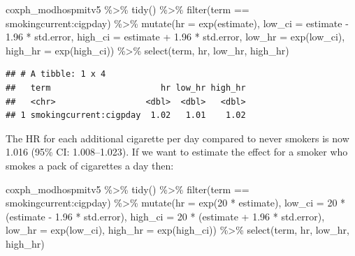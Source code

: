 \documentclass[
]{book}
\newenvironment{Shaded}{\begin{snugshade}}{\end{snugshade}}
\newcommand{\AttributeTok}[1]{\textcolor[rgb]{0.77,0.63,0.00}{#1}}
\newcommand{\DecValTok}[1]{\textcolor[rgb]{0.00,0.00,0.81}{#1}}
\newcommand{\FloatTok}[1]{\textcolor[rgb]{0.00,0.00,0.81}{#1}}
\newcommand{\FunctionTok}[1]{\textcolor[rgb]{0.00,0.00,0.00}{#1}}
\newcommand{\NormalTok}[1]{#1}
\newcommand{\SpecialCharTok}[1]{\textcolor[rgb]{0.00,0.00,0.00}{#1}}
\newcommand{\StringTok}[1]{\textcolor[rgb]{0.31,0.60,0.02}{#1}}
\begin{document}
\begin{Shaded}
\begin{Highlighting}[]
\NormalTok{coxph\_modhospmitv5 }\SpecialCharTok{\%\textgreater{}\%} 
  \FunctionTok{tidy}\NormalTok{() }\SpecialCharTok{\%\textgreater{}\%} 
  \FunctionTok{filter}\NormalTok{(term }\SpecialCharTok{==} \StringTok{\textquotesingle{}smokingcurrent:cigpday\textquotesingle{}}\NormalTok{) }\SpecialCharTok{\%\textgreater{}\%}
  \FunctionTok{mutate}\NormalTok{(}\AttributeTok{hr =} \FunctionTok{exp}\NormalTok{(estimate),}
         \AttributeTok{low\_ci =}\NormalTok{ estimate }\SpecialCharTok{{-}} \FloatTok{1.96} \SpecialCharTok{*}\NormalTok{ std.error, }
         \AttributeTok{high\_ci =}\NormalTok{ estimate }\SpecialCharTok{+} \FloatTok{1.96} \SpecialCharTok{*}\NormalTok{ std.error, }
         \AttributeTok{low\_hr =} \FunctionTok{exp}\NormalTok{(low\_ci), }
         \AttributeTok{high\_hr =} \FunctionTok{exp}\NormalTok{(high\_ci)) }\SpecialCharTok{\%\textgreater{}\%} 
  \FunctionTok{select}\NormalTok{(term, hr, low\_hr, high\_hr)}
\end{Highlighting}
\end{Shaded}

\begin{verbatim}
## # A tibble: 1 x 4
##   term                      hr low_hr high_hr
##   <chr>                  <dbl>  <dbl>   <dbl>
## 1 smokingcurrent:cigpday  1.02   1.01    1.02
\end{verbatim}

The HR for each additional cigarette per day compared to never smokers is now 1.016 (95\% CI: 1.008--1.023). If we want to estimate the effect for a smoker who smokes a pack of cigarettes a day then:

\begin{Shaded}
\begin{Highlighting}[]
\NormalTok{coxph\_modhospmitv5 }\SpecialCharTok{\%\textgreater{}\%} 
  \FunctionTok{tidy}\NormalTok{() }\SpecialCharTok{\%\textgreater{}\%} 
  \FunctionTok{filter}\NormalTok{(term }\SpecialCharTok{==} \StringTok{\textquotesingle{}smokingcurrent:cigpday\textquotesingle{}}\NormalTok{) }\SpecialCharTok{\%\textgreater{}\%}
  \FunctionTok{mutate}\NormalTok{(}\AttributeTok{hr =} \FunctionTok{exp}\NormalTok{(}\DecValTok{20} \SpecialCharTok{*}\NormalTok{ estimate),}
         \AttributeTok{low\_ci =} \DecValTok{20} \SpecialCharTok{*}\NormalTok{ (estimate }\SpecialCharTok{{-}} \FloatTok{1.96} \SpecialCharTok{*}\NormalTok{ std.error), }
         \AttributeTok{high\_ci =} \DecValTok{20} \SpecialCharTok{*}\NormalTok{ (estimate }\SpecialCharTok{+} \FloatTok{1.96} \SpecialCharTok{*}\NormalTok{ std.error), }
         \AttributeTok{low\_hr =} \FunctionTok{exp}\NormalTok{(low\_ci), }
         \AttributeTok{high\_hr =} \FunctionTok{exp}\NormalTok{(high\_ci)) }\SpecialCharTok{\%\textgreater{}\%} 
  \FunctionTok{select}\NormalTok{(term, hr, low\_hr, high\_hr)}
\end{Highlighting}
\end{Shaded}
\end{document}
